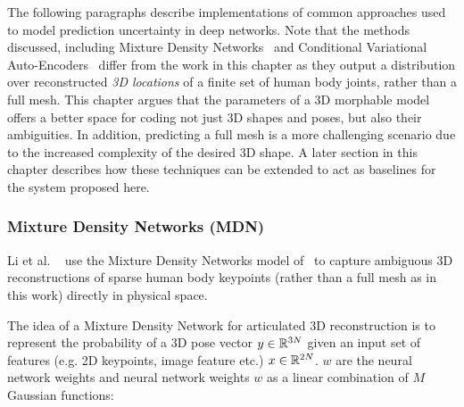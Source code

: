 The following paragraphs describe implementations of common approaches used to model prediction uncertainty in deep networks. Note that the methods discussed, including Mixture Density Networks~\cite{bishop94mixture,li19generating} and Conditional Variational Auto-Encoders~\cite{sharma19monocular} differ from the work in this chapter as they output a distribution over reconstructed \emph{3D locations} of a finite set of human body joints, rather than a full mesh. This chapter argues that the parameters of a 3D morphable model offers a better space for coding not just 3D shapes and poses, but also their ambiguities. In addition, predicting a full mesh is a more challenging scenario due to the increased complexity of the desired 3D shape. A later section in this chapter describes how these techniques can be extended to act as baselines for the system proposed here. 




\subsubsection{Mixture Density Networks (MDN)}

Li et al. ~\cite{li19generating} use the Mixture Density Networks model of~\cite{bishop94mixture} to capture ambiguous 3D reconstructions of sparse human body keypoints (rather than a full mesh as in this work) directly in physical space. 

The idea of a Mixture Density Network for articulated 3D reconstruction is to represent the probability of a 3D pose vector $y \in {\mathbb{R}^{3N}}$ given an input set of features (e.g. 2D keypoints, image feature etc.) $x \in {\mathbb{R}^{2N}}$. $w$ are the neural network weights  and neural network weights $w$ as a linear combination of $M$ Gaussian functions:


